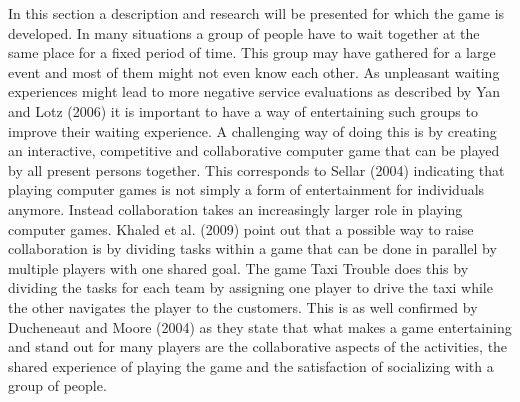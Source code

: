 In this section a description and research will be presented for which the game is developed. In many situations a group of people have to wait together at the same place for a fixed period of time. This group may have gathered for a large event and most of them might not even know each other. As unpleasant waiting experiences might lead to more negative service evaluations as described by Yan and Lotz (2006) it is important to have a way of entertaining such groups to improve their waiting experience. A challenging way of doing this is by creating an interactive, competitive and collaborative computer game that can be played by all present persons together. This corresponds to Sellar (2004) indicating that playing computer games is not simply a form of entertainment for individuals anymore. Instead collaboration takes an increasingly larger role in playing computer games. Khaled et al. (2009) point out that a possible way to raise collaboration is by dividing tasks within a game that can be done in parallel by multiple players with one shared goal. The game Taxi Trouble does this by dividing the tasks for each team by assigning one player to drive the taxi while the other navigates the player to the customers. This is as well confirmed by Ducheneaut and Moore (2004) as they state that what makes a game entertaining and stand out for many players are the collaborative aspects of the activities, the shared experience of playing the game and the satisfaction of socializing with a group of people.